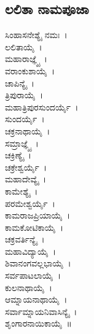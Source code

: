 \begin{multicols}{2}
\section{ಲಲಿತಾ ನಾಮಪೂಜಾ}
ಸಿಂಹಾಸನೇಶ್ಯೈ ನಮಃ~।\\ ಲಲಿತಾಯೈ~।\\ ಮಹಾರಾಜ್ಞ್ಯೈ~।\\ ವರಾಂಕುಶಾಯೈ~।\\ ಚಾಪಿನ್ಯೈ~।\\ ತ್ರಿಪುರಾಯೈ~।\\ ಮಹಾತ್ರಿಪುರಸುಂದರ್ಯೈ~।\\ ಸುಂದರ್ಯೈ~।\\ ಚಕ್ರನಾಥಾಯೈ~।\\ ಸಮ್ರಾಜ್ಞ್ಯೈ~।\\ ಚಕ್ರಿಣ್ಯೈ~।\\ ಚಕ್ರೇಶ್ವರ್ಯೈ~।\\ ಮಹಾದೇವ್ಯೈ~।\\ ಕಾಮೇಶ್ಯೈ~।\\ ಪರಮೇಶ್ವರ್ಯೈ~।\\ ಕಾಮರಾಜಪ್ರಿಯಾಯೈ~।\\ ಕಾಮಕೋಟಿಕಾಯೈ~।\\ ಚಕ್ರವರ್ತಿನ್ಯೈ~।\\ ಮಹಾವಿದ್ಯಾಯೈ~।\\ ಶಿವಾನಂಗವಲ್ಲಭಾಯೈ~।\\ ಸರ್ವಪಾಟಲಾಯೈ~।\\ ಕುಲನಾಥಾಯೈ~।\\ ಆಮ್ನಾಯನಾಥಾಯೈ~।\\ ಸರ್ವಾಮ್ನಾಯನಿವಾಸಿನ್ಯೈ~।\\ ಶೃಂಗಾರನಾಯಿಕಾಯೈ~॥
\end{multicols}
